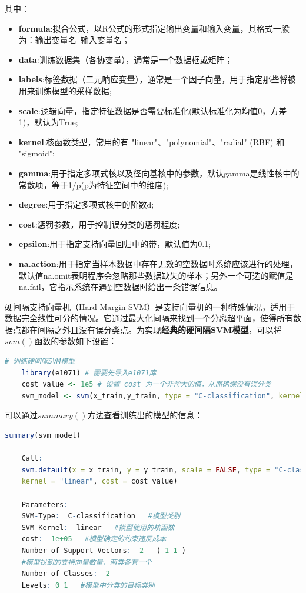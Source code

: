 \documentclass[12pt]{article}  %
\begin{document}
其中：
\begin{itemize}
	\setlength{\parsep}{0ex} %
	\setlength{\topsep}{2ex} %
	\setlength{\itemsep}{1ex} %
	\item \textbf{formula}:拟合公式，以R公式的形式指定输出变量和输入变量，其格式一般为：输出变量名~输入变量名；		
	\item \textbf{data}:训练数据集（各协变量），通常是一个数据框或矩阵；
	\item \textbf{labels}:标签数据（二元响应变量），通常是一个因子向量，用于指定那些将被用来训练模型的采样数据;
	\item \textbf{scale}:逻辑向量，指定特征数据是否需要标准化(默认标准化为均值0，方差1)，默认为True;
	\item \textbf{kernel}:核函数类型，常用的有 "linear"、"polynomial"、"radial" (RBF) 和 "sigmoid";
	\item \textbf{gamma}:用于指定多项式核以及径向基核中的参数，默认gamma是线性核中的常数项，等于1/p(p为特征空间中的维度);
	\item \textbf{degree}:用于指定多项式核中的阶数d;
	\item \textbf{cost}:惩罚参数，用于控制误分类的惩罚程度;
	\item \textbf{epsilon}:用于指定支持向量回归中的带，默认值为0.1;
	\item \textbf{na.action}:用于指定当样本数据中存在无效的空数据时系统应该进行的处理，默认值na.omit表明程序会忽略那些数据缺失的样本；另外一个可选的赋值是na.fail，它指示系统在遇到空数据时给出一条错误信息。
\end{itemize}

硬间隔支持向量机（Hard-Margin SVM）是支持向量机的一种特殊情况，适用于数据完全线性可分的情况。它通过最大化间隔来找到一个分离超平面，使得所有数据点都在间隔之外且没有误分类点。为实现\textbf{经典的硬间隔SVM模型}，可以将$svm()$函数的参数如下设置：
\begin{lstlisting}[language=R]
	# 训练硬间隔SVM模型
	library(e1071) # 需要先导入e1071库
	cost_value <- 1e5 # 设置 cost 为一个非常大的值，从而确保没有误分类
	svm_model <- svm(x_train,y_train, type = "C-classification", kernel = "linear", cost = cost_value, scale = FALSE)
\end{lstlisting}

可以通过$summary()$方法查看训练出的模型的信息：

\begin{lstlisting}[language=R]
	summary(svm_model)
	
	Call:
	svm.default(x = x_train, y = y_train, scale = FALSE, type = "C-classification",
	kernel = "linear", cost = cost_value)
	
	Parameters:
	SVM-Type:  C-classification   #模型类别
	SVM-Kernel:  linear   #模型使用的核函数
	cost:  1e+05   #模型确定的约束违反成本
	Number of Support Vectors:  2	( 1 1 )  
	#模型找到的支持向量数量，两类各有一个
	Number of Classes:  2
	Levels:	0 1   #模型中分类的目标类别
\end{lstlisting}
\end{document}
